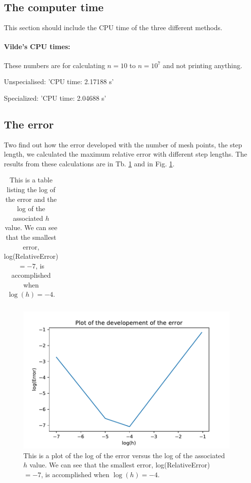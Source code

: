 \subsection{The computer time}

This section should include the CPU time of the three different methods.

\paragraph{Vilde's CPU times:\hspace{4cm}}

\hspace{1cm}\linebreak

These numbers are for calculating $n = 10$ to $n = 10^7$ and not printing anything.

Unspecialised: 'CPU time: 2.17188 s'

Specialized: 'CPU time: 2.04688 s'

\subsection{The error}

Two find out how the error developed with the number of mesh points, the step length, we calculated the maximum relative error with different step lengths. The results from these calculations are in Tb. \ref{tab:error_developement} and in Fig. \ref{fig:error_development}. 

\begin{table}[H]\caption{This is a table listing the log of the error and the log of the associated $h$ value. We can see that the smallest error, log(RelativeError) $= -7$, is accomplished when $\log(h) = -4$.}\label{tab:error_developement}
\begin{tabular}{cc}

\end{tabular}
\end{table}

\begin{figure}[H]
\includegraphics[width=\linewidth]{figures/ErrorDevelopement.pdf}\caption{This is a plot of the log of the error versus the log of the associated $h$ value. We can see that the smallest error, log(RelativeError) $= -7$, is accomplished when $\log(h) = -4$.}\label{fig:error_development}
\end{figure}
